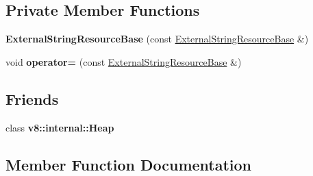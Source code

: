 \subsection*{Private Member Functions}
\begin{DoxyCompactItemize}
\item 
{\bfseries External\+String\+Resource\+Base} (const \hyperlink{classv8_1_1_string_1_1_external_string_resource_base}{External\+String\+Resource\+Base} \&)\hypertarget{classv8_1_1_string_1_1_external_string_resource_base_a04c9e0ef835b5a27f4a6e97387cb5f1b}{}\label{classv8_1_1_string_1_1_external_string_resource_base_a04c9e0ef835b5a27f4a6e97387cb5f1b}

\item 
void {\bfseries operator=} (const \hyperlink{classv8_1_1_string_1_1_external_string_resource_base}{External\+String\+Resource\+Base} \&)\hypertarget{classv8_1_1_string_1_1_external_string_resource_base_a8bee080ff920e233dd72cf336081b4d2}{}\label{classv8_1_1_string_1_1_external_string_resource_base_a8bee080ff920e233dd72cf336081b4d2}

\end{DoxyCompactItemize}
\subsection*{Friends}
\begin{DoxyCompactItemize}
\item 
class {\bfseries v8\+::internal\+::\+Heap}\hypertarget{classv8_1_1_string_1_1_external_string_resource_base_a2d52f783e6ad51ce2c8f89eb1ebc7599}{}\label{classv8_1_1_string_1_1_external_string_resource_base_a2d52f783e6ad51ce2c8f89eb1ebc7599}

\end{DoxyCompactItemize}


\subsection{Member Function Documentation}
